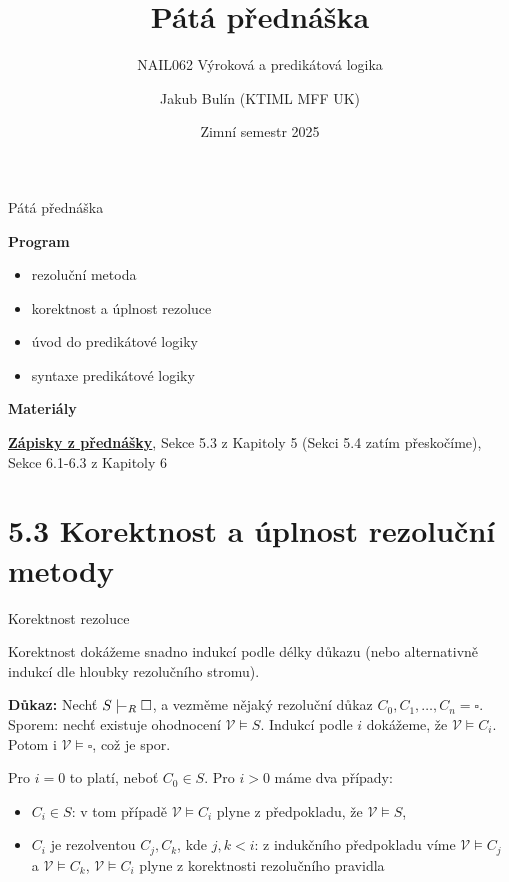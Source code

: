 \documentclass{beamer}
\title{Pátá přednáška}
\subtitle{NAIL062 Výroková a predikátová logika}
\author{Jakub Bulín (KTIML MFF UK)}
\date{Zimní semestr 2025}
\begin{document}
\maketitle


\begin{frame}{Pátá přednáška}

    \textbf{Program}
        \begin{itemize}
            \item rezoluční metoda
            \item korektnost a úplnost rezoluce
            \item úvod do predikátové logiky
            \item syntaxe predikátové logiky
        \end{itemize}

    \textbf{Materiály}

        \href{https://github.com/jbulin-mff-uk/nail062/raw/main/lecture/lecture-notes/lecture-notes.pdf}{\alert{\textbf{Zápisky z přednášky}}}, Sekce 5.3 z Kapitoly 5 (Sekci 5.4 zatím přeskočíme), Sekce 6.1-6.3 z Kapitoly 6

\end{frame}


\section{5.3 Korektnost a úplnost rezoluční metody}


\begin{frame}{Korektnost rezoluce}
    
    Korektnost dokážeme snadno indukcí podle délky důkazu (nebo alternativně indukcí dle hloubky rezolučního stromu).\pause


    \textbf{Důkaz:} Nechť $S\proves_R\square$, a vezměme nějaký rezoluční důkaz $C_0,C_1,\dots,C_n=\square$. \pause \alert{Sporem:} nechť existuje ohodnocení $\mathcal V\models S$. \pause Indukcí podle $i$ dokážeme, že \alert{$\mathcal V\models C_i$}. Potom i $\mathcal V\models \square$, což je spor. \pause
    
    Pro $i=0$ to platí, neboť $C_0\in S$. Pro $i>0$ máme dva případy:\pause
    \begin{itemize}
        \item \alert{$C_i\in S$:} v tom případě $\mathcal V\models C_i$ plyne z předpokladu, že $\mathcal V\models S$,\pause
        \item \alert{$C_i$ je rezolventou $C_j,C_k$, kde $j,k<i$:} z indukčního předpokladu víme $\mathcal V\models C_j$ a $\mathcal V\models C_k$, $\mathcal V\models C_i$ plyne z korektnosti rezolučního pravidla\hfill\qedsymbol
    \end{itemize}

\end{frame}
\end{document}
